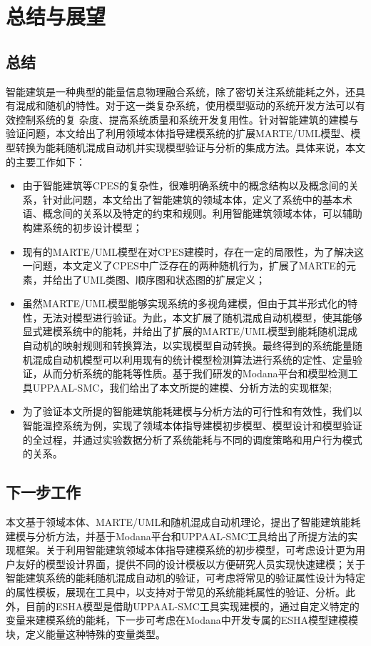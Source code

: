 \chapter{总结与展望}
\label{ch6}
\section{总结}
	智能建筑是一种典型的能量信息物理融合系统，除了密切关注系统能耗之外，还具有混成和随机的特性。对于这一类复杂系统，使用模型驱动的系统开发方法可以有效控制系统的复
杂度、提高系统质量和系统开发复用性。针对智能建筑的建模与验证问题，本文给出了利用领域本体指导建模系统的扩展MARTE/UML模型、模型转换为能耗随机混成自动机并实现模型验证与分析的集成方法。具体来说，本文的主要工作如下：
	\begin{itemize}
	\item 由于智能建筑等CPES的复杂性，很难明确系统中的概念结构以及概念间的关系，针对此问题，本文给出了智能建筑的领域本体，定义了系统中的基本术语、概念间的关系以及特定的约束和规则。利用智能建筑领域本体，可以辅助构建系统的初步设计模型；
	\item 现有的MARTE/UML模型在对CPES建模时，存在一定的局限性，为了解决这一问题，本文定义了CPES中广泛存在的两种随机行为，扩展了MARTE的元素，并给出了UML类图、顺序图和状态图的扩展定义；
	\item 虽然MARTE/UML模型能够实现系统的多视角建模，但由于其半形式化的特性，无法对模型进行验证。为此，本文扩展了随机混成自动机模型，使其能够显式建模系统中的能耗，并给出了扩展的MARTE/UML模型到能耗随机混成自动机的映射规则和转换算法，以实现模型自动转换。最终得到的系统能量随机混成自动机模型可以利用现有的统计模型检测算法进行系统的定性、定量验证，从而分析系统的能耗等性质。基于我们研发的Modana平台和模型检测工具UPPAAL-SMC，我们给出了本文所提的建模、分析方法的实现框架;
	\item 为了验证本文所提的智能建筑能耗建模与分析方法的可行性和有效性，我们以智能温控系统为例，实现了领域本体指导建模初步模型、模型设计和模型验证的全过程，并通过实验数据分析了系统能耗与不同的调度策略和用户行为模式的关系。
	\end{itemize}
	
\section{下一步工作}
	本文基于领域本体、MARTE/UML和随机混成自动机理论，提出了智能建筑能耗建模与分析方法，并基于Modana平台和UPPAAL-SMC工具给出了所提方法的实现框架。关于利用智能建筑领域本体指导建模系统的初步模型，可考虑设计更为用户友好的模型设计界面，提供不同的设计模板以方便研究人员实现快速建模；关于智能建筑系统的能耗随机混成自动机的验证，可考虑将常见的验证属性设计为特定的属性模板，展现在工具中，以支持对于常见的系统能耗属性的验证、分析。此外，目前的ESHA模型是借助UPPAAL-SMC工具实现建模的，通过自定义特定的变量来建模系统的能耗，下一步可考虑在Modana中开发专属的ESHA模型建模模块，定义能量这种特殊的变量类型。
